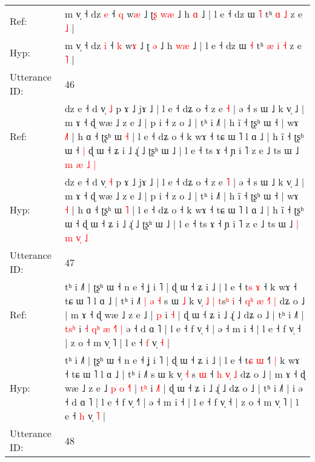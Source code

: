 \documentclass[10pt]{article}
\DeclareRobustCommand{\hl}[1]{{\textcolor{red}{#1}}}
\begin{document}
\begin{longtable}{ll}
Ref: & m v̩ ˧ dz \hl{e} ˧ \hl{q} w\hl{æ} ˩ ʈ\hl{ʂ} \hl{w}\hl{æ} ˩ h \hl{}\hl{ɑ} ˩ | l e ˧ dz ɯ \hl{˥} tʰ\hl{}\hl{} \hl{ɑ} \hl{˩} z e \hl{˩} |
 \\
Hyp: & m v̩ ˧ dz \hl{i} ˧ \hl{k} w\hl{ɤ} ˩ ʈ\hl{} \hl{}\hl{ə} ˩ h \hl{w}\hl{æ} ˩ | l e ˧ dz ɯ \hl{˧} tʰ\hl{ }\hl{æ} \hl{i} \hl{˧} z e \hl{˥} |
 \\
\midrule
Utterance ID: & 46 \\
Ref: & dz e ˧ d v̩ \hl{˩} p ɤ ˩ jɤ ˩ | l e ˧ dʑ o ˧ z e \hl{˧} | ə ˧ s ɯ ˩ k v̩ ˩ | m ɤ ˧ ɖ wæ ˩ z e ˩ | p i ˧ z o ˩ | tʰ i ˩˥ | h ĩ ˧ ʈʂʰ ɯ ˧ | wɤ \hl{˩}\hl{˥} | h ɑ ˧ ʈʂʰ ɯ \hl{˧} | l e ˧ dʑ o ˧ k wɤ ˧ tɕ ɯ ˥ l ɑ ˩ | h ĩ ˧ ʈʂʰ ɯ ˧\hl{ }\hl{|} ɖ ɯ ˧ ʑ i ˩ ɻ̍ ˩ ʈʂʰ ɯ ˩ | l e ˧ ts ɤ ˧ ɲ i ˥ z e ˩ ts ɯ ˩ \hl{m} \hl{æ} \hl{}\hl{˩} \hl{|}
 \\
Hyp: & dz e ˧ d v̩ \hl{˧} p ɤ ˩ jɤ ˩ | l e ˧ dʑ o ˧ z e \hl{˥} | ə ˧ s ɯ ˩ k v̩ ˩ | m ɤ ˧ ɖ wæ ˩ z e ˩ | p i ˧ z o ˩ | tʰ i ˩˥ | h ĩ ˧ ʈʂʰ ɯ ˧ | wɤ \hl{}\hl{˧} | h ɑ ˧ ʈʂʰ ɯ \hl{˥} | l e ˧ dʑ o ˧ k wɤ ˧ tɕ ɯ ˥ l ɑ ˩ | h ĩ ˧ ʈʂʰ ɯ ˧\hl{}\hl{} ɖ ɯ ˧ ʑ i ˩ ɻ̍ ˩ ʈʂʰ ɯ ˩ | l e ˧ ts ɤ ˧ ɲ i ˥ z e ˩ ts ɯ ˩ \hl{|} \hl{m} \hl{v}\hl{̩} \hl{˩}
 \\
\midrule
Utterance ID: & 47 \\
Ref: & tʰ i ˩˥ | ʈʂʰ ɯ ˧ n e ˧ ʝ i ˥ | ɖ ɯ ˧ ʑ i ˩ | l e ˧ t\hl{s} \hl{ɤ} ˧\hl{}\hl{}\hl{} k wɤ ˧ tɕ ɯ ˥ l ɑ ˩ | tʰ i ˩˥\hl{ }\hl{|}\hl{ }\hl{ə}\hl{ }\hl{˧} s ɯ\hl{ }\hl{˩} k v̩\hl{ }\hl{˩} \hl{|} \hl{t}s\hl{ʰ} \hl{i} ˧\hl{ }\hl{q}\hl{ʰ} \hl{æ} \hl{˧}\hl{˥} \hl{|} dʑ o ˩ | m ɤ ˧ ɖ wæ ˩ z e ˩\hl{}\hl{}\hl{}\hl{}\hl{}\hl{}\hl{} | \hl{}\hl{p} i \hl{}\hl{˧} | ɖ ɯ ˧ ʑ i ˩ ɻ̍ ˩ dʑ o ˩ | tʰ i ˩˥ |\hl{ }\hl{t}\hl{s}\hl{ʰ} i\hl{ }\hl{˧}\hl{ }\hl{q}\hl{ʰ}\hl{ }\hl{æ}\hl{ }\hl{˧}\hl{˥}\hl{ }\hl{|} ə ˧ d ɑ ˥ | l e ˧ f v̩ ˧\hl{} | ə ˧ m i ˧ | l e ˧ f v̩ ˧ | z o ˧ m v̩ ˥ | l e ˧ \hl{f} v̩ \hl{˧} |
 \\
Hyp: & tʰ i ˩˥ | ʈʂʰ ɯ ˧ n e ˧ ʝ i ˥ | ɖ ɯ ˧ ʑ i ˩ | l e ˧ t\hl{ɕ} \hl{ɯ} ˧\hl{˥}\hl{ }\hl{|} k wɤ ˧ tɕ ɯ ˥ l ɑ ˩ | tʰ i ˩˥\hl{}\hl{}\hl{}\hl{}\hl{}\hl{} s ɯ\hl{}\hl{} k v̩\hl{}\hl{} \hl{˧} \hl{}s\hl{} \hl{ɯ} ˧\hl{}\hl{}\hl{} \hl{h} \hl{v}\hl{̩} \hl{˩} dʑ o ˩ | m ɤ ˧ ɖ wæ ˩ z e ˩\hl{ }\hl{p}\hl{ }\hl{o}\hl{ }\hl{˧}\hl{˥} | \hl{t}\hl{ʰ} i \hl{˩}\hl{˥} | ɖ ɯ ˧ ʑ i ˩ ɻ̍ ˩ dʑ o ˩ | tʰ i ˩˥ |\hl{}\hl{}\hl{}\hl{} i\hl{}\hl{}\hl{}\hl{}\hl{}\hl{}\hl{}\hl{}\hl{}\hl{}\hl{}\hl{} ə ˧ d ɑ ˥ | l e ˧ f v̩ ˧\hl{˥} | ə ˧ m i ˧ | l e ˧ f v̩ ˧ | z o ˧ m v̩ ˥ | l e ˧ \hl{h} v̩ \hl{˥} |
 \\
\midrule
Utterance ID: & 48 \\

\end{longtable}
\end{document}
